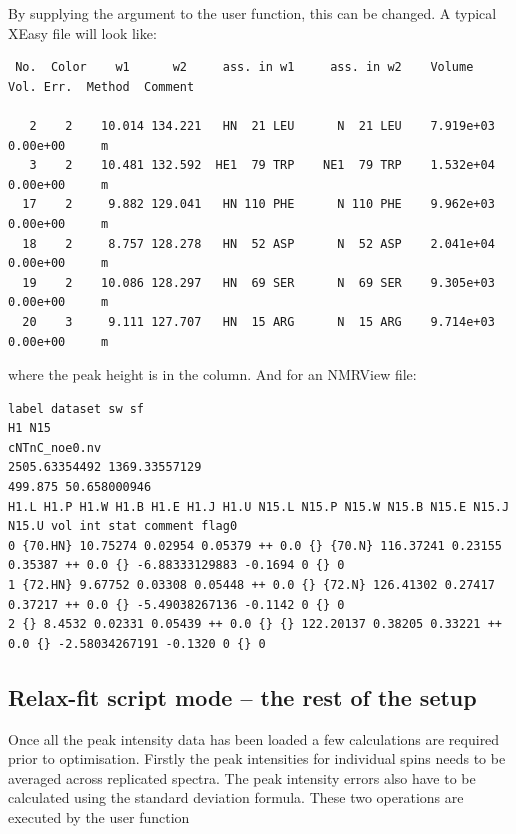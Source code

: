 By supplying the  argument to the  user function, this can be changed.  A typical XEasy file will look like:

{\scriptsize \begin{verbatim}
 No.  Color    w1      w2     ass. in w1     ass. in w2    Volume     Vol. Err.  Method  Comment

   2    2    10.014 134.221   HN  21 LEU      N  21 LEU    7.919e+03  0.00e+00     m
   3    2    10.481 132.592  HE1  79 TRP    NE1  79 TRP    1.532e+04  0.00e+00     m
  17    2     9.882 129.041   HN 110 PHE      N 110 PHE    9.962e+03  0.00e+00     m
  18    2     8.757 128.278   HN  52 ASP      N  52 ASP    2.041e+04  0.00e+00     m
  19    2    10.086 128.297   HN  69 SER      N  69 SER    9.305e+03  0.00e+00     m
  20    3     9.111 127.707   HN  15 ARG      N  15 ARG    9.714e+03  0.00e+00     m
\end{verbatim}}

where the peak height is in the  column.  And for an NMRView file:

{\tiny \begin{verbatim}
label dataset sw sf
H1 N15
cNTnC_noe0.nv
2505.63354492 1369.33557129
499.875 50.658000946
H1.L H1.P H1.W H1.B H1.E H1.J H1.U N15.L N15.P N15.W N15.B N15.E N15.J N15.U vol int stat comment flag0
0 {70.HN} 10.75274 0.02954 0.05379 ++ 0.0 {} {70.N} 116.37241 0.23155 0.35387 ++ 0.0 {} -6.88333129883 -0.1694 0 {} 0
1 {72.HN} 9.67752 0.03308 0.05448 ++ 0.0 {} {72.N} 126.41302 0.27417 0.37217 ++ 0.0 {} -5.49038267136 -0.1142 0 {} 0
2 {} 8.4532 0.02331 0.05439 ++ 0.0 {} {} 122.20137 0.38205 0.33221 ++ 0.0 {} -2.58034267191 -0.1320 0 {} 0
\end{verbatim}}



\subsection{Relax-fit script mode -- the rest of the setup} \label{sect: Rx setup fin}

Once all the peak intensity data has been loaded a few calculations are required prior to optimisation.  Firstly the peak intensities for individual spins needs to be averaged across replicated spectra.  The peak intensity errors also have to be calculated using the standard deviation formula.  These two operations are executed by the user function

